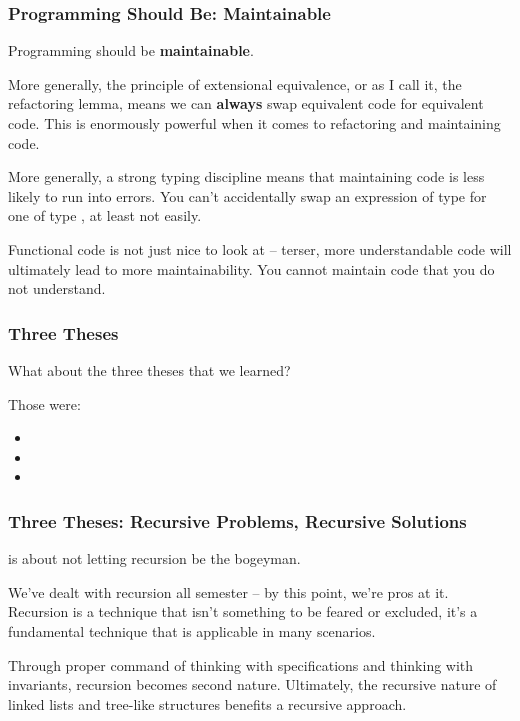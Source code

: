 \documentclass[aspectratio=169, handout]{beamer}
\begin{document}
\begin{frame}[fragile]
  \frametitle{Programming Should Be: Maintainable}

  Programming should be \textbf{maintainable}.

  \pause
  \vspace{\fill}

  More generally, the principle of extensional equivalence, or as I call it,
  the refactoring lemma, means we can \textbf{always} swap equivalent code
  for equivalent code. This is enormously powerful when it comes to refactoring
  and maintaining code.

  \pause
  \vspace{\fill}

  More generally, a strong typing discipline means that maintaining code is
  less likely to run into errors. You can't accidentally swap an expression
  of type  for one of type , at least not easily.

  \pause
  \vspace{\fill}

  Functional code is not just nice to look at -- terser, more understandable
  code will ultimately lead to more maintainability. You cannot maintain
  code that you do not understand.
\end{frame}

\begin{frame}[fragile]
  \frametitle{Three Theses}

  What about the three theses that we learned?

  \pause
  \vspace{\fill}

  Those were:
  \pause
  \begin{itemize}
    \item {} \pause
    \item {} \pause
    \item {}
  \end{itemize}
\end{frame}

\begin{frame}[fragile]
  \frametitle{Three Theses: Recursive Problems, Recursive Solutions}

   is about not letting recursion
  be the bogeyman.

  \pause
  \vspace{\fill}

  We've dealt with recursion all semester -- by this point, we're pros at it.
  Recursion is a technique that isn't something to be feared or excluded,
  it's a fundamental technique that is applicable in many scenarios.

  \pause
  \vspace{\fill}

  Through proper command of thinking with specifications and thinking with
  invariants, recursion becomes second nature. Ultimately, the recursive
  nature of linked lists and tree-like structures benefits a recursive
  approach.
\end{frame}
\end{document}
